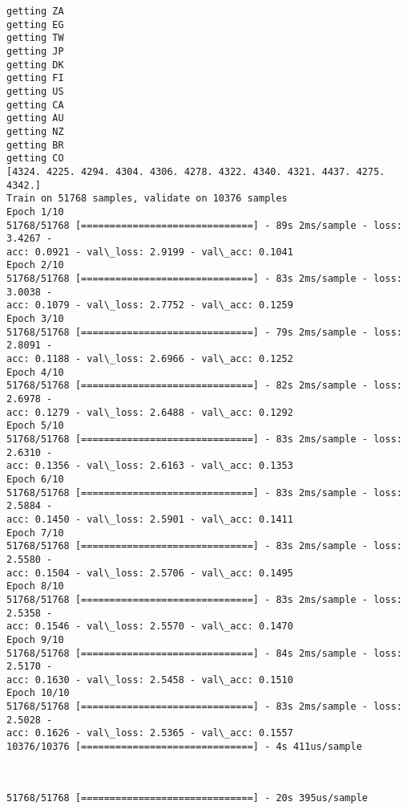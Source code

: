 \documentclass[11pt]{article}
\begin{document}
    \begin{Verbatim}[commandchars=\\\{\}]
getting ZA
getting EG
getting TW
getting JP
getting DK
getting FI
getting US
getting CA
getting AU
getting NZ
getting BR
getting CO
[4324. 4225. 4294. 4304. 4306. 4278. 4322. 4340. 4321. 4437. 4275. 4342.]
Train on 51768 samples, validate on 10376 samples
Epoch 1/10
51768/51768 [==============================] - 89s 2ms/sample - loss: 3.4267 -
acc: 0.0921 - val\_loss: 2.9199 - val\_acc: 0.1041
Epoch 2/10
51768/51768 [==============================] - 83s 2ms/sample - loss: 3.0038 -
acc: 0.1079 - val\_loss: 2.7752 - val\_acc: 0.1259
Epoch 3/10
51768/51768 [==============================] - 79s 2ms/sample - loss: 2.8091 -
acc: 0.1188 - val\_loss: 2.6966 - val\_acc: 0.1252
Epoch 4/10
51768/51768 [==============================] - 82s 2ms/sample - loss: 2.6978 -
acc: 0.1279 - val\_loss: 2.6488 - val\_acc: 0.1292
Epoch 5/10
51768/51768 [==============================] - 83s 2ms/sample - loss: 2.6310 -
acc: 0.1356 - val\_loss: 2.6163 - val\_acc: 0.1353
Epoch 6/10
51768/51768 [==============================] - 83s 2ms/sample - loss: 2.5884 -
acc: 0.1450 - val\_loss: 2.5901 - val\_acc: 0.1411
Epoch 7/10
51768/51768 [==============================] - 83s 2ms/sample - loss: 2.5580 -
acc: 0.1504 - val\_loss: 2.5706 - val\_acc: 0.1495
Epoch 8/10
51768/51768 [==============================] - 83s 2ms/sample - loss: 2.5358 -
acc: 0.1546 - val\_loss: 2.5570 - val\_acc: 0.1470
Epoch 9/10
51768/51768 [==============================] - 84s 2ms/sample - loss: 2.5170 -
acc: 0.1630 - val\_loss: 2.5458 - val\_acc: 0.1510
Epoch 10/10
51768/51768 [==============================] - 83s 2ms/sample - loss: 2.5028 -
acc: 0.1626 - val\_loss: 2.5365 - val\_acc: 0.1557
10376/10376 [==============================] - 4s 411us/sample
    \end{Verbatim}

    \begin{center}
    \end{center}
    { \hspace*{\fill} \\}
    
    \begin{Verbatim}[commandchars=\\\{\}]
51768/51768 [==============================] - 20s 395us/sample
    \end{Verbatim}

    \begin{center}
    \end{center}
    { \hspace*{\fill} \\}
    
\end{document}
